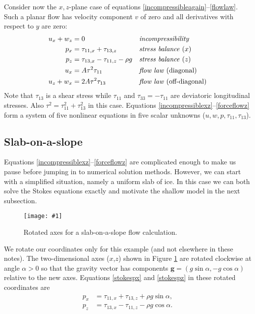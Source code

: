 \documentclass[letterpaper,final,12pt,reqno]{amsart}
\newcommand{\onefigsize}[3]{
\begin{figure}[ht]
\centering
\texttt{[image: \#1]}
\caption{#2}
\label{fig:#1}
\end{figure}}
\newcommand{\onefig}[2]{\onefigsize{#1}{#2}{3.0in}}
\begin{document}
Consider now the $x,z$-plane case of equations \eqref{incompressibleagain}--\eqref{flowlaw}.  Such a planar flow has velocity component $v$ of zero and all derivatives with respect to $y$ are zero:
\begin{align}
u_x + w_z &= 0 &&\text{\emph{incompressibility}} \label{incompressiblexz} \\
p_x &= \tau_{11,x} + \tau_{13,z} &&\text{\emph{stress balance} ($x$)} \label{stokespx} \\
p_z &= \tau_{13,x} - \tau_{11,z} - \rho g &&\text{\emph{stress balance} ($z$)} \label{stokespz} \\
u_x &= A \tau^2 \tau_{11} &&\text{\emph{flow law} (diagonal)}  \label{forceflowx} \\
u_z + w _x &= 2 A \tau^2 \tau_{13} &&\text{\emph{flow law} (off-diagonal)} \label{forceflowz}
\end{align}
Note that $\tau_{13}$ is a shear stress while $\tau_{11}$ and $\tau_{33}=-\tau_{11}$ are deviatoric longitudinal stresses.  Also $\tau^2 = \tau_{11}^2+\tau_{13}^2$ in this case.  Equations \eqref{incompressiblexz}--\eqref{forceflowz} form a system of five nonlinear equations in five scalar unknowns ($u,w,p,\tau_{11},\tau_{13}$).

\subsection*{Slab-on-a-slope}  Equations \eqref{incompressiblexz}--\eqref{forceflowz} are complicated enough to make us pause before jumping in to numerical solution methods.  However, we can start with a simplified situation, namely a uniform slab of ice.  In this case we can both solve the Stokes equations exactly and motivate the shallow model in the next subsection.

\onefig{slab}{Rotated axes for a slab-on-a-slope flow calculation.}

We rotate our coordinates only for this example (and not elsewhere in these notes).  The two-dimensional axes ($x$,$z$) shown in Figure \ref{fig:slab} are rotated clockwise at angle $\alpha>0$ so that the gravity vector has components $\mathbf{g} = (g \sin\alpha,- g \cos \alpha)$ relative to the new axes.  Equations \eqref{stokespx} and \eqref{stokespz} in these rotated coordinates are
\begin{align}
p_x &= \tau_{11,x} + \tau_{13,z} + \rho g \sin\alpha, \label{stokespxrot} \\
p_z &= \tau_{13,x} - \tau_{11,z} - \rho g \cos\alpha. \label{stokespzrot}
\end{align}
\end{document}
